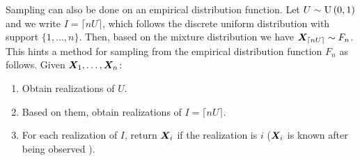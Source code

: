 \begin{enumerate}
Sampling can also be done on an empirical distribution function.
Let \(U\sim\operatorname{U}\left(0,1\right)\) and we write \(I=\lceil nU\rceil\), which follows the
discrete uniform distribution with support \(\{1,\dotsc,n\}\). Then, based on
the mixture distribution we have \(\bm{X}_{\lceil nU\rceil}\sim
F_n\). This hints a method for sampling from the empirical
distribution function \(F_n\) as follows. Given
\(\bm{X}_1,\dotsc,\bm{X}_n\):
\begin{enumerate}[label={(\arabic*)}]
\item Obtain realizations of \(U\).
\item Based on them, obtain realizations of \(I=\lceil nU\rceil\).
\item For each realization of \(I\), return \(\bm{X}_i\) if the realization
is \(i\) (\(\bm{X}_i\) is known after being observed ).
\end{enumerate}
\end{enumerate}
